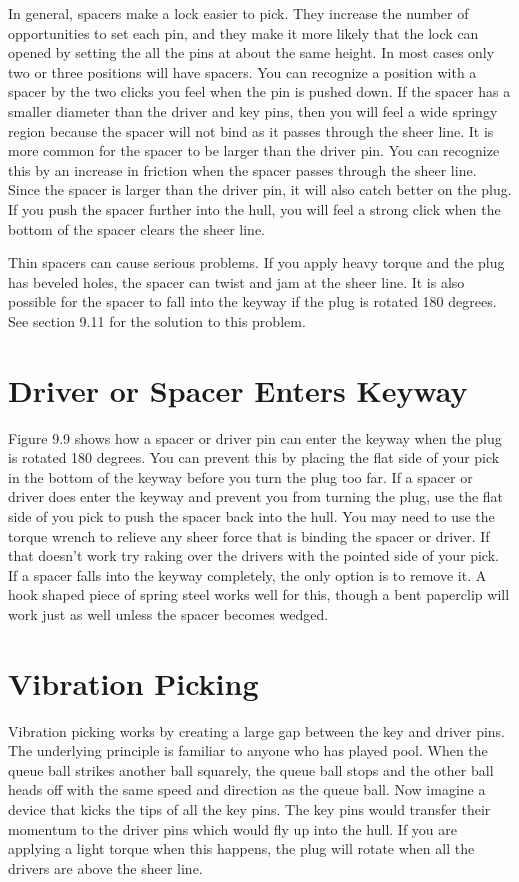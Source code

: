 In general, spacers make a lock easier to pick. They increase the number of opportunities 
to set each pin, and they make it more likely that the lock can opened by setting the all the 
pins at about the same height. In most cases only two or three positions will have spacers. 
You can recognize a position with a spacer by the two clicks you feel when the pin is pushed 
down. If the spacer has a smaller diameter than the driver and key pins, then you will feel a 
wide springy region because the spacer will not bind as it passes through the sheer line. It is
more common for the spacer to be larger than the driver pin. You can recognize this by an 
increase in friction when the spacer passes through the sheer line. Since the spacer is larger 
than the driver pin, it will also catch better on the plug. If you push the spacer further into 
the hull, you will feel a strong click when the bottom of the spacer clears the sheer line. 

Thin spacers can cause serious problems. If you apply heavy torque and the plug has 
beveled holes, the spacer can twist and jam at the sheer line. It is also possible for the spacer 
to fall into the keyway if the plug is rotated 180 degrees. See section 9.11 for the solution to 
this problem.

\section{Driver or Spacer Enters Keyway}
Figure 9.9 shows how a spacer or driver pin can enter the keyway when the plug is rotated 
180 degrees. You can prevent this by placing the flat side of your pick in the bottom of the 
keyway before you turn the plug too far. If a spacer or driver does enter the keyway and 
prevent you from turning the plug, use the flat side of you pick to push the spacer back into
the hull. You may need to use the torque wrench to relieve any sheer force that is binding 
the spacer or driver. If that doesn't work try raking over the drivers with the pointed side 
of your pick. If a spacer falls into the keyway completely, the only option is to remove it. A 
hook shaped piece of spring steel works well for this, though a bent paperclip will work just 
as well unless the spacer becomes wedged. 

\section{Vibration Picking}
Vibration picking works by creating a large gap between the key and driver pins. The 
underlying principle is familiar to anyone who has played pool. When the queue ball strikes 
another ball squarely, the queue ball stops and the other ball heads off with the same speed 
and direction as the queue ball. Now imagine a device that kicks the tips of all the key pins. 
The key pins would transfer their momentum to the driver pins which would fly up into the 
hull. If you are applying a light torque when this happens, the plug will rotate when all the 
drivers are above the sheer line.

